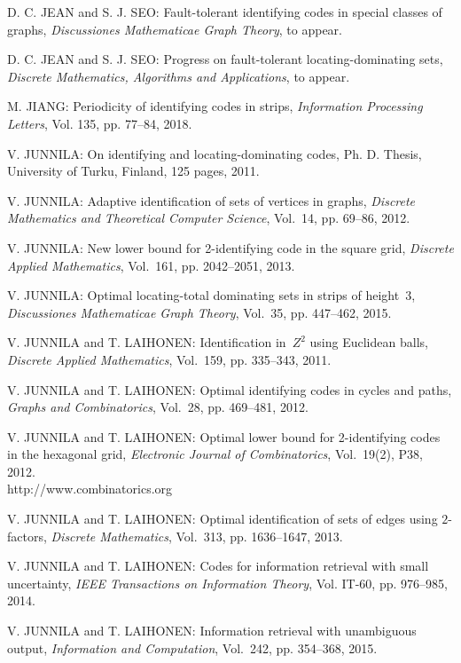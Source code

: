 \begin{thebibliography}{999}
D. C. JEAN and S. J. SEO: Fault-tolerant identifying codes in special classes of graphs, {\it Discussiones Mathematicae Graph Theory}, to appear.

D. C. JEAN and S. J. SEO: Progress on fault-tolerant locating-dominating sets, {\it Discrete Mathematics, Algorithms and Applications}, to appear.

M. JIANG: Periodicity of identifying codes in strips, {\it Information Processing Letters}, Vol. 135, pp. 77--84, 2018.

V. JUNNILA: On identifying and locating-dominating codes, Ph. D. Thesis, University of Turku, Finland, 125 pages, 2011.

V. JUNNILA: Adaptive identification of sets of vertices in graphs, {\it Discrete Mathematics and Theoretical Computer Science}, Vol.~14, pp. 69--86, 2012.

V. JUNNILA: New lower bound for 2-identifying code in the square grid, {\it Discrete Applied Mathematics}, Vol.~161, pp. 2042--2051, 2013.

V. JUNNILA: Optimal locating-total dominating sets in strips of height~3, {\it Discussiones Mathematicae Graph Theory}, Vol.~35, pp. 447--462, 2015.

V. JUNNILA and T. LAIHONEN: Identification in~$Z^2$ using Euclidean balls, {\it Discrete Applied Mathematics}, Vol.~159, pp. 335--343, 2011.

V. JUNNILA and T. LAIHONEN: Optimal identifying codes in cycles and paths, {\it Graphs and Combinatorics}, Vol.~28, pp. 469--481, 2012.

V. JUNNILA and T. LAIHONEN: Optimal lower bound for 2-identifying codes in the hexagonal grid, {\it Electronic Journal of Combinatorics}, Vol.~19(2), P38, 2012.\\
http://www.combinatorics.org

V. JUNNILA and T. LAIHONEN: Optimal identification of sets of edges using $2$-factors, {\it Discrete Mathematics}, Vol.~313, pp. 1636--1647, 2013.

V. JUNNILA and T. LAIHONEN: Codes for information retrieval with small uncertainty, {\it IEEE Transactions on Information Theory}, Vol. IT-60, pp. 976--985, 2014.

  V. JUNNILA and T. LAIHONEN: Information retrieval with unambiguous output, {\it Information and Computation}, Vol.~242, pp. 354--368, 2015.


\end{thebibliography}
